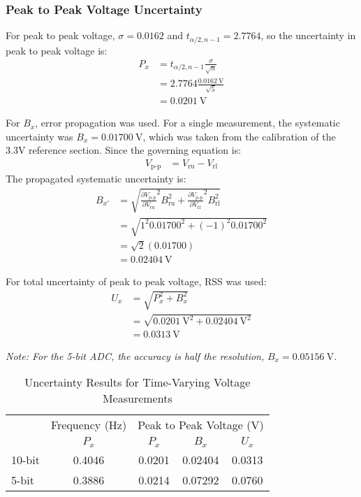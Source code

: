 \subsubsection{Peak to Peak Voltage Uncertainty}
\noindent For peak to peak voltage, $\sigma = 0.0162$ and $t_{\alpha/2, n-1} = 2.7764$, so the uncertainty in peak to peak voltage is:
\[
\begin{aligned}
      P_x &= t_{\alpha/2, n-1} \frac{\sigma}{\sqrt{n}} \\
                &= 2.7764 \frac{\qty{0.0162}{\volt}}{\sqrt{5}} \\
                  &= \qty{0.0201}{\volt}
\end{aligned}
\]

\noindent For $B_x$, error propagation was used. For a single measurement, the systematic uncertainty was
$B_{x} = \qty{0.01700}{\volt}$, which was taken from the calibration of the 3.3V reference section. 
Since the governing equation is:
\[
\begin{aligned}
      V_{\text{p-p}} &= V_{\text{ru}} - V_{\text{rl}}
\end{aligned}
\]
\noindent The propagated systematic uncertainty is:
\[
   \begin{aligned}
      B_{x'} &= \sqrt{\frac{\partial V_{\text{p-p}}}{\partial V_{\text{ru}}}^2 B_{\text{ru}}^2 
      + \frac{\partial V_{\text{p-p}}}{\partial V_{\text{rl}}}^2 B_{\text{rl}}^2} \\
            &= \sqrt{1^2 \qty{0.01700}^2 + (-1)^2 \qty{0.01700}^2} \\
            &= \sqrt{2} (0.01700) \\
            &= \qty{0.02404}{\volt}
   \end{aligned}
\]

\noindent For total uncertainty of peak to peak voltage, RSS was used:
\[
\begin{aligned}
      U_x &= \sqrt{P_{x}^2 + B_{x}^2} \\
            &= \sqrt{\qty{0.0201}{\volt}^2 + \qty{0.02404}{\volt}^2} \\
            &= \qty{0.0313}{\volt}
\end{aligned}
\]

\noindent \textit{Note: For the 5-bit ADC, the accuracy is half the resolution,} $B_{x} = \qty{0.05156}{\volt}$.  

\begin{table}[h]
      \centering
      \caption{Uncertainty Results for Time-Varying Voltage Measurements}
      \begin{tabular}{lcccc}
      \toprule
         & Frequency (Hz) & \multicolumn{3}{c}{Peak to Peak Voltage (V)} \\
      \cmidrule(lr){2-2} \cmidrule(lr){3-5}
         & $P_x$ & $P_x$ & $B_x$ & $U_x$ \\
      \midrule
      10-bit & 0.4046 & 0.0201 & 0.02404 & 0.0313 \\
      5-bit  & 0.3886 & 0.0214 & 0.07292 & 0.0760 \\
      \bottomrule
      \end{tabular}
\end{table}
      




